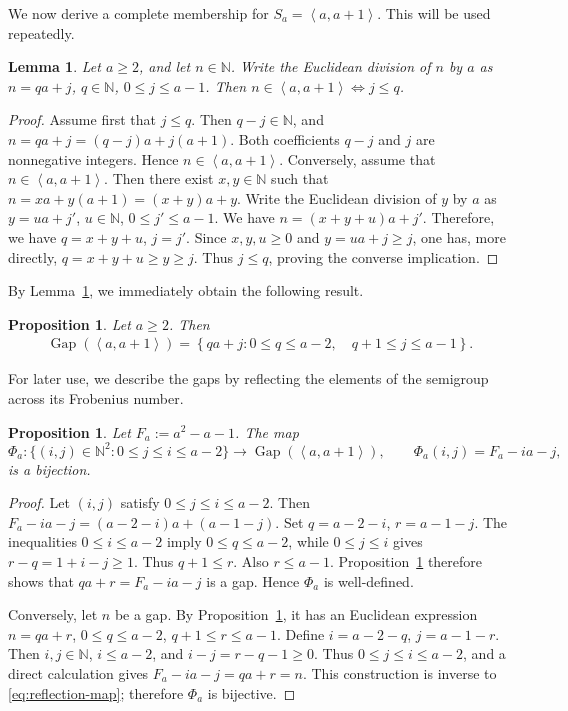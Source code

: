 \documentclass[reqno, 12pt]{article}
\numberwithin{equation}{section}
\newtheorem{proposition}[theorem]{Proposition}
\newtheorem{lemma}[theorem]{Lemma}
\theoremstyle{definition}
\newcommand{\NN}{\mathbb{N}}
\newcommand{\gen}[1]{\left\langle #1\right\rangle}
\newcommand{\Gap}{\operatorname{Gap}}
\begin{document}
We now derive a complete membership for $S_a=\gen{a,a+1}$.  This will be used repeatedly.

\begin{lemma}\label{lem:membership}
Let $a\ge2$, and let $n\in\NN$.  Write the Euclidean division of $n$ by $a$
as $n=qa+j$, $q\in\NN$, $0\le j\le a-1$.
Then $n\in\gen{a,a+1} \Longleftrightarrow j\le q$.
\end{lemma}
\begin{proof}
Assume first that $j\le q$.  Then $q-j\in\NN$, and $n=qa+j=(q-j)a+j(a+1)$. Both coefficients $q-j$ and $j$ are nonnegative integers.  Hence $n\in\gen{a,a+1}$.
Conversely, assume that $n\in\gen{a,a+1}$.  Then there exist $x,y\in\NN$ such that $n=xa+y(a+1)=(x+y)a+y$. Write the Euclidean division of $y$ by $a$ as $y=ua+j'$, $u\in\NN$, $0\le j'\le a-1$.
We have $n=(x+y+u)a+j'$. Therefore, we have $q=x+y+u$, $j=j'$.
Since $x,y,u\ge0$ and $y=ua+j\ge j$, one has, more directly, $q=x+y+u\ge y\ge j$.
Thus $j\le q$, proving the converse implication.
\end{proof}

By Lemma~\ref{lem:membership}, we immediately obtain the following result.

\begin{proposition}\label{prop:gaps-consecutive}
Let $a\ge2$. Then
\begin{align*}
 \Gap(\gen{a,a+1})=\left\{qa+j:0\le q\le a-2,\quad q+1\le j\le a-1\right\}.
\end{align*}
\end{proposition}


For later use, we describe the gaps by reflecting the elements of the
semigroup across its Frobenius number.

\begin{proposition}\label{prop:reflection-param}
Let $F_a:=a^2-a-1$. The map
\begin{equation}\label{eq:reflection-map}
\Phi_a:\{(i,j)\in\NN^2:0\le j\le i\le a-2\}\longrightarrow\Gap(\gen{a,a+1}),\qquad\Phi_a(i,j)=F_a-ia-j,
\end{equation}
is a bijection. 
\end{proposition}
\begin{proof}
Let $(i,j)$ satisfy $0\le j\le i\le a-2$.  Then $F_a-ia-j=(a-2-i)a+(a-1-j)$.
Set $q=a-2-i$, $r=a-1-j$.
The inequalities $0\le i\le a-2$ imply $0\le q\le a-2$, while $0\le j\le i$ gives $r-q=1+i-j\ge1$.
Thus $q+1\le r$.  Also $r\le a-1$.  Proposition~\ref{prop:gaps-consecutive} therefore shows that $qa+r=F_a-ia-j$ is a gap.  Hence $\Phi_a$ is well-defined.

Conversely, let $n$ be a gap.  By Proposition~\ref{prop:gaps-consecutive}, it has an Euclidean expression $n=qa+r$, $0\le q\le a-2$, $q+1\le r\le a-1$. Define $i=a-2-q$, $j=a-1-r$. Then $i,j\in\NN$, $i\le a-2$, and $i-j=r-q-1\ge0$.
Thus $0\le j\le i\le a-2$, and a direct calculation gives $F_a-ia-j=qa+r=n$.
This construction is inverse to \cref{eq:reflection-map}; therefore $\Phi_a$ is bijective.
\end{proof}
\end{document}
